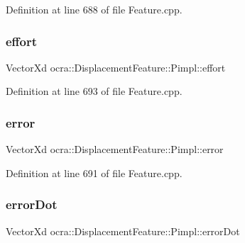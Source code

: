 Definition at line 688 of file Feature.\+cpp.

\hypertarget{structocra_1_1DisplacementFeature_1_1Pimpl_a9df9dfcb9f2d59c1f09bd676c3589e7b}{}\label{structocra_1_1DisplacementFeature_1_1Pimpl_a9df9dfcb9f2d59c1f09bd676c3589e7b} 
\subsubsection{\texorpdfstring{effort}{effort}}
{\footnotesize\ttfamily Vector\+Xd ocra\+::\+Displacement\+Feature\+::\+Pimpl\+::effort}



Definition at line 693 of file Feature.\+cpp.

\hypertarget{structocra_1_1DisplacementFeature_1_1Pimpl_a98721661ee9190e726390f6049ffdf1b}{}\label{structocra_1_1DisplacementFeature_1_1Pimpl_a98721661ee9190e726390f6049ffdf1b} 
\subsubsection{\texorpdfstring{error}{error}}
{\footnotesize\ttfamily Vector\+Xd ocra\+::\+Displacement\+Feature\+::\+Pimpl\+::error}



Definition at line 691 of file Feature.\+cpp.

\hypertarget{structocra_1_1DisplacementFeature_1_1Pimpl_ad5d72a6e8baf66f182ff8ec61a74530a}{}\label{structocra_1_1DisplacementFeature_1_1Pimpl_ad5d72a6e8baf66f182ff8ec61a74530a} 
\subsubsection{\texorpdfstring{error\+Dot}{errorDot}}
{\footnotesize\ttfamily Vector\+Xd ocra\+::\+Displacement\+Feature\+::\+Pimpl\+::error\+Dot}



